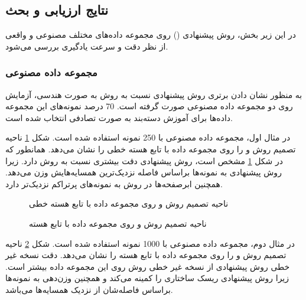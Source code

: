 \subsection{نتایج ارزیابی و بحث}\label{sec:5:3:3}
 در این زیر بخش، روش پیشنهادی () روی مجموعه داده‌های مختلف مصنوعی و واقعی از نظر دقت و سرعت یادگیری بررسی می‌شود.
 
\subsubsection{مجموعه داده مصنوعی}\label{sec:5:3:3:1}
 به منظور نشان دادن برتری روش پیشنهادی نسبت به روش  به صورت هندسی، آزمایش روی دو مجموعه داده مصنوعی صورت گرفته است. 70 درصد نمونه‌های این مجموعه داده‌ها برای آموزش دسته‌بند به صورت تصادفی انتخاب شده است.
 
 در مثال اول، مجموعه داده مصنوعی  با 250 نمونه استفاده شده است. شکل ‏\ref{fig:WLTSVM-vs-RKNN-TSVM-R} ناحیه تصمیم روش  و  را روی مجموعه داده  با تابع هسته خطی را نشان می‌دهد. همانطور که در شکل \ref{fig:WLTSVM-vs-RKNN-TSVM-R} مشخص است، روش پیشنهادی دقت بیشتری نسبت به روش  دارد. زیرا روش پیشنهادی به نمونه‌ها براساس فاصله نزدیک‌ترین همسایه‌هایش وزن می‌دهد. همچنین ابرصفحه‌ها در روش  به نمونه‌های پرتراکم نزدیک‌تر دارد. 
 
 \begin{figure}[!t]
 	\centering
 	\caption{ناحیه تصمیم روش  و  روی مجموعه داده  با تابع هسته خطی}
 	\label{fig:WLTSVM-vs-RKNN-TSVM-R}
 \end{figure}
\begin{figure}[!t]
	\centering
	\caption{ناحیه تصمیم روش   و  روی مجموعه داده  با تابع هسته }
	\label{fig:WLTSVM-vs-RKNN-TSVM-C}
\end{figure}

در مثال دوم، مجموعه داده مصنوعی  با 1000 نمونه استفاده شده است. شکل \ref{fig:WLTSVM-vs-RKNN-TSVM-C} ناحیه تصمیم روش  و  را روی مجموعه داده  با تابع هسته  را نشان می‌دهد. دقت نسخه غیر خطی روش پیشنهادی از نسخه غیر خطی روش  روی این مجموعه داده بیشتر است. زیرا روش پیشنهادی ریسک ساختاری را کمینه می‌کند و همچنین وزن‌دهی به نمونه‌ها براساس فاصله‌شان از نزدیک همسایه‌ها می‌باشد.


